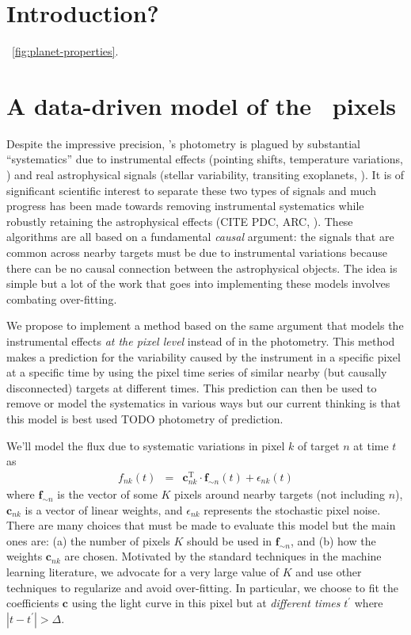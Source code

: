 \documentclass[letterpaper,12pt,preprint]{hack_aastex}
\newcommand{\bvec}[1]{{\ensuremath{{\boldsymbol{#1}}}}}
\begin{document}
\section{Introduction?}


\figurename~\ref{fig:planet-properties}.


\section{A data-driven model of the \Kepler\ pixels}

Despite the impressive precision, \Kepler's photometry is plagued by
substantial ``systematics'' due to instrumental effects (pointing shifts,
temperature variations, \etc) and real astrophysical signals (stellar
variability, transiting exoplanets, \etc).
It is of significant scientific interest to separate these two types of
signals and much progress has been made towards removing instrumental
systematics while robustly retaining the astrophysical effects (CITE PDC, ARC,
\etc).
These algorithms are all based on a fundamental \emph{causal} argument: the
signals that are common across nearby targets must be due to instrumental
variations because there can be no causal connection between the astrophysical
objects.
The idea is simple but a lot of the work that goes into implementing these
models involves combating over-fitting.

We propose to implement a method based on the same argument that models the
instrumental effects \emph{at the pixel level} instead of in the photometry.
This method makes a prediction for the variability caused by the instrument in
a specific pixel at a specific time by using the pixel time series of similar
nearby (but causally disconnected) targets at different times.
This prediction can then be used to remove or model the systematics in various
ways but our current thinking is that this model is best used TODO photometry
of prediction.

We'll model the flux due to systematic variations in pixel $k$ of target
$n$ at time $t$ as
\begin{eqnarray}
f_{nk}(t) &=& \bvec{c}_{nk}^\mathrm{T}\cdot\bvec{f}_{\sim n}(t)
              + \epsilon_{nk}(t)
\end{eqnarray}
where $\bvec{f}_{\sim n}$ is the vector of some $K$ pixels around nearby
targets (not including $n$), $\bvec{c}_{nk}$ is a vector of linear weights,
and $\epsilon_{nk}$ represents the stochastic pixel noise.
There are many choices that must be made to evaluate this model but the main
ones are: (a) the number of pixels $K$ should be used in $\bvec{f}_{\sim n}$,
and (b) how the weights $\bvec{c}_{nk}$ are chosen.
Motivated by the standard techniques in the machine learning literature, we
advocate for a very large value of $K$ and use other techniques to regularize
and avoid over-fitting.
In particular, we choose to fit the coefficients $\bvec{c}$ using the light
curve in this pixel but at \emph{different times} $t^\prime$ where
$|t-t^\prime| > \Delta$.
\end{document}
